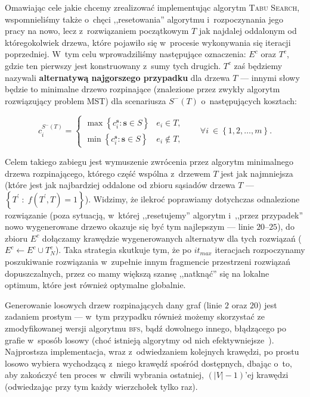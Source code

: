 Omawiając cele jakie chcemy zrealizować implementując algorytm \textsc{Tabu Search}, wspomnieliśmy także o~chęci ,,resetowania'' algorytmu i~rozpoczynania jego pracy na nowo, lecz z~rozwiązaniem początkowym $T$ jak najdalej oddalonym od któregokolwiek drzewa, które pojawiło się w~procesie wykonywania się iteracji poprzedniej. W~tym celu wprowadziliśmy następujące oznaczenia: $E^{c}$ oraz $T^{c}$, gdzie ten pierwszy jest konstruowany z~sumy tych drugich. $T^{c}$ zaś będziemy nazywali \textbf{alternatywą najgorszego przypadku} dla drzewa $T$ --- innymi słowy będzie to minimalne drzewo rozpinające (znalezione przez zwykły algorytm rozwiązujący problem \textsc{MST}) dla scenariusza $S^{-} \left( T \right)$ o~następujących kosztach:

\begin{equation}
	c^{S^{-} \left( T \right)}_{i} = \left\{\begin{matrix}
	\max \left\{ c^{\textbf{s}}_{i} : \textbf{s} \in S \right\} & e_{i} \in T\text{,}\\ 
	\min \left\{ c^{\textbf{s}}_{i} : \textbf{s} \in S \right\} & e_{i} \notin T\text{,}
	\end{matrix}\right. \qquad \forall i~\in \left\{ 1, 2, \dots, m \right\}\text{.}
\end{equation}

Celem takiego zabiegu jest wymuszenie zwrócenia przez algorytm minimalnego drzewa rozpinającego, którego część wspólna z~drzewem $T$ jest jak najmniejsza (które jest jak najbardziej oddalone od zbioru sąsiadów drzewa $T$ --- $\left\{ T^{\prime} \; : \; f \left( T^{\prime}, T \right) = 1 \right\}$). Widzimy, że ilekroć poprawiamy dotychczas odnalezione rozwiązanie (poza sytuacją, w~której ,,resetujemy'' algorytm i~,,przez przypadek'' nowo wygenerowane drzewo okazuje się być tym najlepszym --- linie $20$--$25$), do zbioru $E^{c}$ dołączamy krawędzie wygenerowanych alternatyw dla tych rozwiązań ($E^{c} \leftarrow E^{c} \cup T_{N}^{c}$). Taka strategia skutkuje tym, że po $it_{max}$ iteracjach rozpoczynamy poszukiwanie rozwiązania w~zupełnie innym fragmencie przestrzeni rozwiązań dopuszczalnych, przez co mamy większą szansę ,,natknąć'' się na lokalne optimum, które jest również optymalne globalnie.

Generowanie losowych drzew rozpinających dany graf (linie $2$ oraz $20$) jest zadaniem prostym --- w~tym przypadku również możemy skorzystać ze zmodyfikowanej wersji algorytmu \textsc{bfs}, bądź dowolnego innego, błądzącego po grafie w~sposób losowy (choć istnieją algorytmy od nich efektywniejsze~\cite{Wilson:1996:GRS:237814.237880}). Najprostsza implementacja, wraz z~odwiedzaniem kolejnych krawędzi, po prostu losowo wybiera wychodzącą z~niego krawędź spośród dostępnych, dbając o~to, aby zakończyć ten proces w~chwili wybrania ostatniej, $\left( \left| V \right| - 1\right)$'ej krawędzi (odwiedzając przy tym każdy wierzchołek tylko raz).

